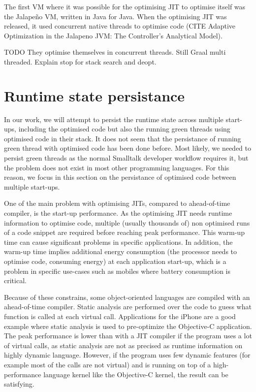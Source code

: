 \documentclass[a4paper,12pt,twoside]{../includes/ThesisStyle}
\begin{document}
The first VM where it was possible for the optimising JIT to optimise itself was the Jalape\~no VM, written in Java for Java. When the optimising JIT was released, it used concurrent native threads to optimise code (CITE Adaptive Optimization in the Jalapeno JVM: The Controller's Analytical Model).

TODO
They optimise themselves in concurrent threads. Still Graal multi threaded. Explain stop for stack search and deopt.


\section{Runtime state persistance}
\label{sec:persistance}

In our work, we will attempt to persist the runtime state across multiple start-ups, including the optimised code but also the running green threads using optimised code in their stack. It does not seem that the persistance of running green thread with optimised code has been done before. Most likely, we needed to persist green threads as the normal Smalltalk developer workflow requires it, but the problem does not exist in most other programming languages. For this reason, we focus in this section on the persistance of optimised code between multiple start-ups.

One of the main problem with optimising JITs, compared to ahead-of-time compiler, is the start-up performance. As the optimising JIT needs runtime information to optimise code, multiple (usually thousands of) non optimised runs of a code snippet are required before reaching peak performance. This warm-up time can cause significant problems in specific applications. In addition, the warm-up time implies additional energy consumption (the processor needs to optimise code, consuming energy) at each application start-up, which is a problem in specific use-cases such as mobiles where battery consumption is critical.

Because of these constrains, some object-oriented languages are compiled with an ahead-of-time compiler. Static analysis are performed over the code to guess what function is called at each virtual call. Applications for the iPhone are a good example where static analysis is used to pre-optimize the Objective-C application. The peak performance is lower than with a JIT compiler if the program uses a lot of virtual calls, as static analysis are not as precised as runtime information on highly dynamic language. However, if the program uses few dynamic features (for example most of the calls are not virtual) and is running on top of a high-performance language kernel like the Objective-C kernel, the result can be satisfying.
\end{document}
